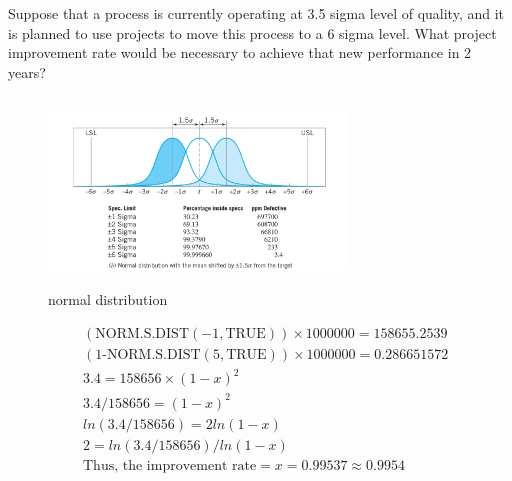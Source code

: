 Suppose that a process is currently operating at 3.5 sigma level of quality, and it is planned  to  use  projects  to  move  this  process  to  a  6 sigma  level.  What  project improvement rate would be necessary to achieve that new performance in 2 years? 
        
    \begin{figure}[h]
        \centering
        \includegraphics[width=8cm, height=5cm]{figures/normal distribution.jpeg}
        \caption{normal distribution}
        \label{fig:1}
    \end{figure}
 
    \begin{align*}
        & (\text{NORM.S.DIST}(-1, \text{TRUE})) \times 1000000 = 158655.2539 \\
        & (\text{1-NORM.S.DIST}(5, \text{TRUE})) \times 1000000 = 0.286651572 \\
        & 3.4 = 158656 \times (1-x)^2 \\
        & 3.4 / 158656 = (1-x)^2 \\
        & ln(3.4 / 158656) = 2ln(1-x) \\
        & 2 = ln(3.4 / 158656) / ln(1-x) \\
        & \text{Thus, the improvement rate} = x = 0.99537 \approx 0.9954 \\
    \end{align*}
